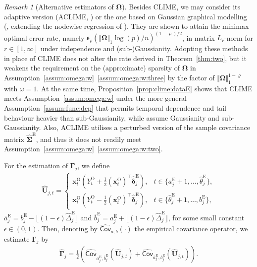 \documentclass[11pt, a4paper]{article}
\newcommand{\mbf}{\mathbf}
\renewcommand{\l}{\left}
\renewcommand{\r}{\right}
\def\wh{\widehat}
\newcommand{\cp}{\theta}
\newcommand{\Cov}[0]{\mathsf{Cov}}
\newcommand{\tE}{\text{E}}
\newcommand{\tO}{\text{O}}
\theoremstyle{definition}
\theoremstyle{definition}
\theoremstyle{definition}
\theoremstyle{definition}
\theoremstyle{definition}
\theoremstyle{remark}
\newtheorem{rem}{Remark}[section]
\theoremstyle{definition}
\theoremstyle{definition}
\theoremstyle{definition}
\begin{document}
\begin{rem}[Alternative estimators of $\bm\Omega$]
\label{rem:alter}
	Besides CLIME, we may consider its adaptive version (ACLIME, \citealp{cai2016estimating}) 
	or the one based on Gaussian graphical modelling (\citealp{liu2017tiger}, extending the nodewise regression of \citealp{MeBu06}).
 They are shown to attain the minimax optimal error rate, namely $\mathfrak{s}_\varrho (\Vert \bm\Omega \Vert_1 \log(p)/n)^{(1 - \varrho)/2}$, in matrix $L_r$-norm for $r \in [1, \infty]$ under independence and (sub-)Gaussianity.
Adopting these methods in place of CLIME does not alter the rate derived in Theorem~\ref{thm:two}, but it weakens the requirement on the (approximate) sparsity of $\bm\Omega$ in Assumption~\ref{assum:omega:w}~\ref{assum:omega:w:three} by the factor of $\Vert \bm\Omega \Vert_1^{1 - \varrho}$ with $\omega = 1$. 
At the same time, Proposition~\ref{prop:clime:dataE} shows that CLIME meets Assumption~\ref{assum:omega:w} under the more general Assumption~\ref{assum:func:dep} that permits temporal dependence and tail behaviour heavier than sub-Gaussianity, while \cite{liu2017tiger} assume Gaussianity and \cite{cai2016estimating} sub-Gaussianity.
Also, ACLIME utilises a perturbed version of the sample covariance matrix $\wh{\bm\Sigma}^{\tE}$, and thus it does not readily meet Assumption~\ref{assum:omega:w}~\ref{assum:omega:w:two}.
\end{rem}

For the estimation of $\bm\Gamma_j$, we define
\begin{align*}
\wh{\mbf U}_{j, t} = \l\{\begin{array}{ll}
\mbf x^{\tO}_t \l(Y^{\tO}_t + \frac{1}{2} (\mbf x_t^{\tO})^\top \wh{\bm\delta}^{\tE}_j \r),
& t \in \{a^{\tE}_j + 1, \ldots, \wh\cp^{\tE}_j\},
\\
\mbf x^{\tO}_t \l(Y^{\tO}_t - \frac{1}{2} (\mbf x_t^{\tO})^\top \wh{\bm\delta}^{\tE}_j \r), 
& t \in \{\wh\cp^{\tE}_j + 1, \ldots, b^{\tE}_j\},
\end{array}\r.
\end{align*}
$\bar{a}^{\tE}_j = b^{\tE}_j - \lfloor (1 - \epsilon) \wh{\Delta}^{\tE}_j \rfloor$ and $\bar{b}^{\tE}_j = a^{\tE}_j + \lfloor (1 - \epsilon) \wh{\Delta}^{\tE}_j \rfloor$, for some small constant $\epsilon \in (0, 1)$. Then, denoting by $\wh{\Cov}_{a, b}(\cdot)$ the empirical covariance operator, we estimate $\bm\Gamma_j$ by
\begin{align*}
\wh{\bm\Gamma}_j = \frac{1}{2} \l( \wh{\Cov}_{a^{\tE}_j, \bar{b}^{\tE}_j}( \wh{\mbf U}_{j, t} ) + \wh{\Cov}_{\bar{a}^{\tE}_j, b^{\tE}_j}( \wh{\mbf U}_{j, t} ) \r).
\end{align*}
\end{document}
